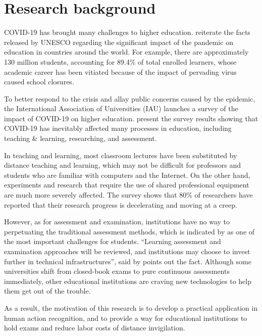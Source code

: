 \section{Research background}
\label{sec:Research background}
COVID-19 has brought many challenges to higher education.
\citet{marinoni2020impact} reiterate the facts released by UNESCO regarding the significant impact of the pandemic on education in countries around the world.
For example, there are approximately 130 million students, accounting for 89.4\% of total enrolled learners, whose academic career has been vitiated because of the impact of pervading virus caused school closures.

To better respond to the crisis and allay public concerns caused by the epidemic, the International Association of Universities (IAU) launches a survey of the impact of COVID-19 on higher education.
\citet{marinoni2020impact} present the survey results showing that COVID-19 has inevitably affected many processes in education, including teaching \& learning, researching, and assessment.

In teaching and learning, most classroom lectures have been substituted by distance teaching and learning, which may not be difficult for professors and students who are familiar with computers and the Internet.
On the other hand, experiments and research that require the use of shared professional equipment are much more severely affected.
The survey shows that 80\% of researchers have reported that their research progress is decelerating and moving at a creep.

However, as for assessment and examination, institutions have no way to perpetuating the traditional assessment methods, which is indicated by \citet{clark2020testing} as one of the most important challenges for students.
``Learning assessment and examination approaches will be reviewed, and institutions may choose to invest further in technical infrastructures'', said by \citet{marinoni2020impact} points out the fact.
Although some universities shift from closed-book exams to pure continuous assessments immediately, other educational institutions are craving new technologies to help them get out of the trouble.

As a result, the motivation of this research is to develop a practical application in human action recognition, and to provide a way for educational institutions to hold exams and reduce labor costs of distance invigilation.

